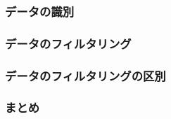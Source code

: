 
\subsubsection{データの識別}

\subsubsection{データのフィルタリング}

\subsubsection{データのフィルタリングの区別}

\subsubsection{まとめ}

